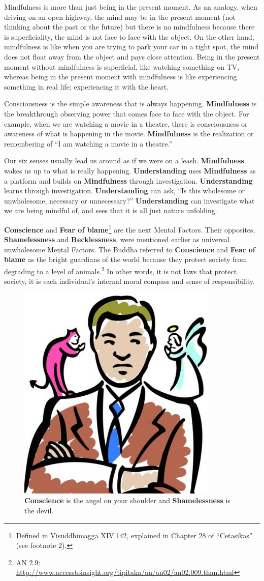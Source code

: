 Mindfulness is more than just being in the present moment. As an analogy, when driving on an open highway, the mind may be in the present moment (not thinking about the past or the future) but there is no mindfulness because there is superficiality, the mind is not face to face with the object. On the other hand, mindfulness is like when you are trying to park your car in a tight spot, the mind does not float away from the object and pays close attention. Being in the present moment without mindfulness is superficial, like watching something on TV, whereas being in the present moment with mindfulness is like experiencing something in real life; experiencing it with the heart.

Consciousness is the simple awareness that is always happening. \textbf{Mindfulness} is the breakthrough observing power that comes face to face with the object. For example, when we are watching a movie in a theatre, there is consciousness or awareness of what is happening in the movie. \textbf{Mindfulness} is the realization or remembering of “I am watching a movie in a theatre.” 

Our six senses usually lead us around as if we were on a leash. \textbf{Mindfulness} wakes us up to what is really happening. \textbf{Understanding} uses \textbf{Mindfulness} as a platform and builds on \textbf{Mindfulness} through investigation. \textbf{Understanding} learns through investigation. \textbf{Understanding} can ask, “Is this wholesome or unwholesome, necessary or unnecessary?” \textbf{Understanding} can investigate what we are being mindful of, and sees that it is all just nature unfolding.

\textbf{Conscience} and \textbf{Fear of blame}\footnote{Defined in Visuddhimagga XIV.142, explained in Chapter 28 of “Cetasikas” (see footnote 2).} are the next Mental Factors. Their opposites, \textbf{Shamelessness} and \textbf{Recklessness}, were mentioned earlier as universal unwholesome Mental Factors. The Buddha referred to \textbf{Conscience} and \textbf{Fear of blame} as the bright guardians of the world because they protect society from degrading to a level of animals.\footnote{AN 2.9: \url{http://www.accesstoinsight.org/tipitaka/an/an02/an02.009.than.html}} In other words, it is not laws that protect society, it is each individual’s internal moral compass and sense of responsibility.

\begin{figure}[h]
\centering
\includegraphics[width=0.17\linewidth]{./Diagrams/AngelDevil}
\caption{\textbf{Conscience} is the angel on your shoulder and \textbf{Shamelessness} is the devil.}
\label{fig:AngelDevil}
\end{figure}

